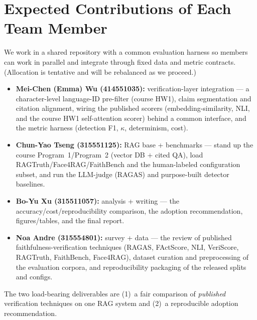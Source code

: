 \section{Expected Contributions of Each Team Member}

We work in a shared repository with a common evaluation harness so members can work in
parallel and integrate through fixed data and metric contracts. (Allocation is tentative
and will be rebalanced as we proceed.)

\begin{itemize}
    \item \textbf{Mei-Chen (Emma) Wu (414551035):} verification-layer integration ---
    a character-level language-ID pre-filter (course HW1), claim segmentation and citation
    alignment, wiring the published scorers
    (embedding-similarity, NLI, and the course HW1 self-attention scorer) behind a common
    interface, and the metric harness (detection F1, $\kappa$, determinism, cost).
    \item \textbf{Chun-Yao Tseng (315551125):} RAG base + benchmarks --- stand up the
    course Program~1/Program~2 (vector DB $+$ cited QA), load RAGTruth/Face4RAG/FaithBench
    and the human-labeled configuration subset, and run the LLM-judge (RAGAS) and
    purpose-built detector baselines.
    \item \textbf{Bo-Yu Xu (315511057):} analysis + writing --- the
    accuracy/cost/reproducibility comparison, the adoption recommendation, figures/tables,
    and the final report.
    \item \textbf{Noa Andre (315554801):} survey + data --- the review of published
    faithfulness-verification techniques (RAGAS, FActScore, NLI, VeriScore, RAGTruth,
    FaithBench, Face4RAG), dataset curation and preprocessing of the evaluation corpora,
    and reproducibility packaging of the released splits and configs.
\end{itemize}

The two load-bearing deliverables are (1)~a fair comparison of \emph{published}
verification techniques on one RAG system and (2)~a reproducible adoption recommendation.
